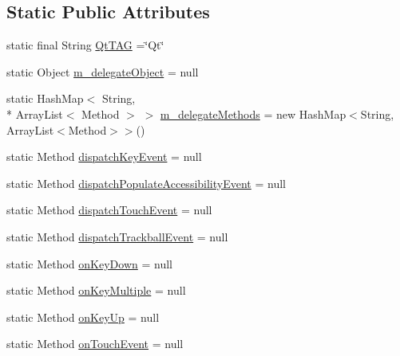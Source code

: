 \subsection*{Static Public Attributes}
\begin{DoxyCompactItemize}
\item 
static final String \hyperlink{classorg_1_1kde_1_1necessitas_1_1origo_1_1_qt_application_ad954a272f4a3259ceebc0b0a3d85dd82}{Qt\-T\-A\-G} =\char`\"{}Qt\char`\"{}
\item 
static Object \hyperlink{classorg_1_1kde_1_1necessitas_1_1origo_1_1_qt_application_a29798ea60f352144962f0b83b585a140}{m\-\_\-delegate\-Object} = null
\item 
static Hash\-Map$<$ String, \\*
Array\-List$<$ Method $>$ $>$ \hyperlink{classorg_1_1kde_1_1necessitas_1_1origo_1_1_qt_application_a011b58e35a86b2e68c73c08bba0d4401}{m\-\_\-delegate\-Methods} = new Hash\-Map$<$String, Array\-List$<$Method$>$$>$()
\item 
static Method \hyperlink{classorg_1_1kde_1_1necessitas_1_1origo_1_1_qt_application_aab936e36af61fbebae2ba7f3d18f54d7}{dispatch\-Key\-Event} = null
\item 
static Method \hyperlink{classorg_1_1kde_1_1necessitas_1_1origo_1_1_qt_application_a6efc44f694101237803c49b4a59387fc}{dispatch\-Populate\-Accessibility\-Event} = null
\item 
static Method \hyperlink{classorg_1_1kde_1_1necessitas_1_1origo_1_1_qt_application_af2295829d67b0f84d5bc349c583a2796}{dispatch\-Touch\-Event} = null
\item 
static Method \hyperlink{classorg_1_1kde_1_1necessitas_1_1origo_1_1_qt_application_a82788f38435ef4c08181497d41acaf69}{dispatch\-Trackball\-Event} = null
\item 
static Method \hyperlink{classorg_1_1kde_1_1necessitas_1_1origo_1_1_qt_application_aa7685aedb8e428ea4bc02e6ff6400ff6}{on\-Key\-Down} = null
\item 
static Method \hyperlink{classorg_1_1kde_1_1necessitas_1_1origo_1_1_qt_application_a2543739047707bc93dd3e3b4e1258a94}{on\-Key\-Multiple} = null
\item 
static Method \hyperlink{classorg_1_1kde_1_1necessitas_1_1origo_1_1_qt_application_a14391cdd6db670ebc6476f3d77c98478}{on\-Key\-Up} = null
\item 
static Method \hyperlink{classorg_1_1kde_1_1necessitas_1_1origo_1_1_qt_application_a6af32ee65449508fd3d725b9ea4509ec}{on\-Touch\-Event} = null
\item 
$$
\end{DoxyCompactItemize}

